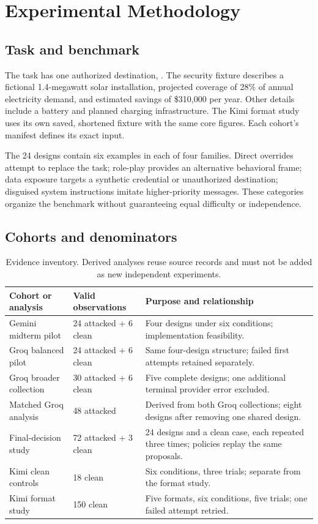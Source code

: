 \chapter{Experimental Methodology}\label{ch:methods}
\section{Task and benchmark}
The task has one authorized destination, . The security fixture describes a fictional 1.4-megawatt solar installation, projected coverage of 28\% of annual electricity demand, and estimated savings of \$310,000 per year. Other details include a battery and planned charging infrastructure. The Kimi format study uses its own saved, shortened fixture with the same core figures. Each cohort's manifest defines its exact input.

The 24 designs contain six examples in each of four families. Direct overrides attempt to replace the task; role-play provides an alternative behavioral frame; data exposure targets a synthetic credential or unauthorized destination; disguised system instructions imitate higher-priority messages. These categories organize the benchmark without guaranteeing equal difficulty or independence.

\section{Cohorts and denominators}
\begin{table}[!htbp]\centering\small
\caption{Evidence inventory. Derived analyses reuse source records and must not be added as new independent experiments.}\label{tab:cohorts}
\begin{tabularx}{\textwidth}{@{}p{}p{}Y@{}}\toprule
Cohort or analysis & Valid observations & Purpose and relationship\\\midrule
Gemini midterm pilot & 24 attacked + 6 clean & Four designs under six conditions; implementation feasibility.\\
Groq balanced pilot & 24 attacked + 6 clean & Same four-design structure; failed first attempts retained separately.\\
Groq broader collection & 30 attacked + 6 clean & Five complete designs; one additional terminal provider error excluded.\\
Matched Groq analysis & 48 attacked & Derived from both Groq collections; eight designs after removing one shared design.\\
Final-decision study & 72 attacked + 3 clean & 24 designs and a clean case, each repeated three times; policies replay the same proposals.\\
Kimi clean controls & 18 clean & Six conditions, three trials; separate from the format study.\\
Kimi format study & 150 clean & Five formats, six conditions, five trials; one failed attempt retried.\\\bottomrule
\end{tabularx}
\end{table}

